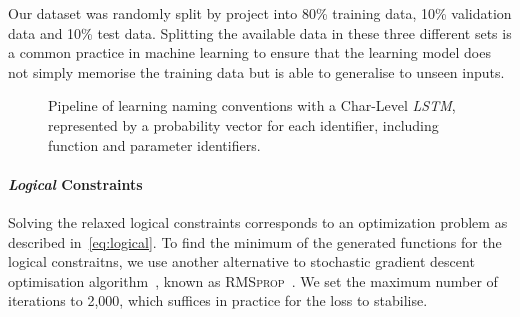 \documentclass[acmsmall, review, anonymous]{acmart}\settopmatter{printfolios=true,printccs=false,printacmref=false}
\newcommand{\projectname}{\textsc{OptTyper}\xspace}
\begin{document}
Our dataset was randomly split by project into 80\% training data,
10\% validation data and 10\% test data.
%
Splitting the available data in these three different sets is a common practice in machine learning
to ensure that the learning model does not simply memorise the training data
but is able to generalise to unseen inputs. 
\begin{figure*}[!t]
    \centering
    \def\svgwidth{\linewidth}
    
  \caption{Pipeline of learning naming conventions with 
  a Char-Level \textit{LSTM}, represented by a probability vector for each identifier, including function and parameter identifiers.
  }\label{fig:Char-Level}
\end{figure*}

\paragraph{\textit{Logical} Constraints} 
Solving the relaxed logical constraints corresponds to an optimization 
problem as described in~\eqref{eq:logical}.
To find the minimum of the generated functions for the logical constraitns, we use another alternative to stochastic gradient descent optimisation algorithm~\cite{robbins51},
known as \textsc{RMSprop}~\cite{tieleman2014}.
We set the maximum number of iterations to 2,000, which suffices in practice for the loss to stabilise.

\end{document}
